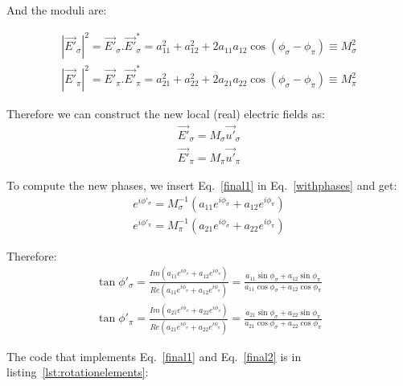 \documentclass{iucr}
\begin{document}
And the moduli are: 

\begin{eqnarray}
|\vec{E'}_\sigma|^2 = \vec{E'}_\sigma . \vec{E'}_\sigma^*  = 
a_{11}^2 + a_{12}^2 + 2 a_{11} a_{12} \cos(\phi_\sigma-\phi_\pi) \equiv
M_\sigma^2 \nonumber \\ 
|\vec{E'}_\pi|^2    = \vec{E'}_\pi    . \vec{E'}_\pi^*     = 
a_{21}^2 + a_{22}^2 + 2 a_{21} a_{22} \cos(\phi_\sigma-\phi_\pi) \equiv
M_\pi^2
\end{eqnarray}

Therefore we can construct the new local (real) electric fields as: 
\begin{eqnarray}
\label{final1}
\vec{E'}_\sigma = M_\sigma \vec{u'}_\sigma  \nonumber \\ 
\vec{E'}_\pi = M_\pi \vec{u'}_\pi  
\end{eqnarray}

To compute the new phases, we insert Eq.~\ref{final1} in Eq.~\ref{withphases} and get: 
\begin{eqnarray}
e^{i \phi'_\sigma} = M_\sigma^{-1} (a_{11} e^{i \phi_\sigma} + a_{12} e^{i \phi_\pi})  \nonumber \\ 
e^{i \phi'_\pi} =  M_\pi^{-1}      (a_{21} e^{i \phi_\sigma} + a_{22} e^{i \phi_\pi}) 
\end{eqnarray}

Therefore:
\begin{eqnarray}
\label{final2}
\tan{\phi'_\sigma} = \frac{Im(a_{11} e^{i \phi_\sigma} + a_{12} e^{i \phi_\pi})}
                          {Re(a_{11} e^{i \phi_\sigma} + a_{12} e^{i \phi_\pi})} = 
                          \frac{a_{11} \sin{\phi_\sigma} + a_{12} \sin{\phi_\pi}}
                               {a_{11} \cos{\phi_\sigma} + a_{12} \cos{\phi_\pi}}  \nonumber \\ 
\tan{\phi'_\pi} =  \frac{Im(a_{21} e^{i \phi_\sigma} + a_{22} e^{i \phi_\pi})}
                        {Re(a_{21} e^{i \phi_\sigma} + a_{22} e^{i \phi_\pi})} = 
                        \frac{a_{21} \sin{\phi_\sigma} + a_{22} \sin{\phi_\pi}}
                             {a_{21} \cos{\phi_\sigma} + a_{22} \cos{\phi_\pi}}
\end{eqnarray}


The code that implements Eq.~\ref{final1} and Eq.~\ref{final2} is in listing~\ref{lst:rotationelements}: 

\end{document}
